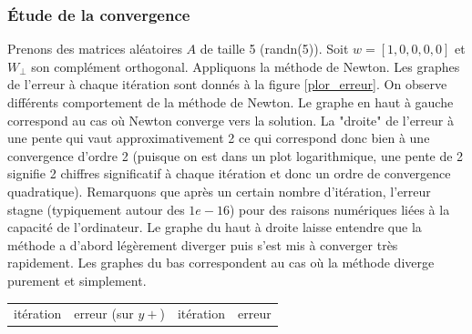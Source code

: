 \subsubsection{Étude de la convergence}
Prenons des matrices aléatoires $A$ de taille 5 (randn(5)). Soit $w=[1,0,0,0,0]$ et $W_{\bot}$ son complément orthogonal. Appliquons la méthode de Newton. Les graphes de l'erreur à chaque itération sont donnés à la figure \ref{plor_erreur}. On observe différents comportement de la méthode de Newton. Le graphe en haut à gauche correspond au cas où Newton converge vers la solution. La "droite" de l'erreur à une pente qui vaut approximativement 2 ce qui correspond donc bien à une convergence d'ordre 2 (puisque on est dans un plot logarithmique, une pente de 2 signifie 2 chiffres significatif à chaque itération et donc un ordre de convergence quadratique). Remarquons que après un certain nombre d'itération, l'erreur stagne (typiquement autour des $1e-16$) pour des raisons numériques liées à la capacité de l'ordinateur. Le graphe du haut à droite laisse entendre que la méthode a d'abord légèrement diverger puis s'est mis à converger très rapidement. Les graphes du bas correspondent au cas où la méthode diverge purement et simplement.

\begin{table}
\centering
\begin{tabular}{cccc}
itération & erreur (sur $y+$) & itération & erreur\\
\end{tabular}
\end{table}  

